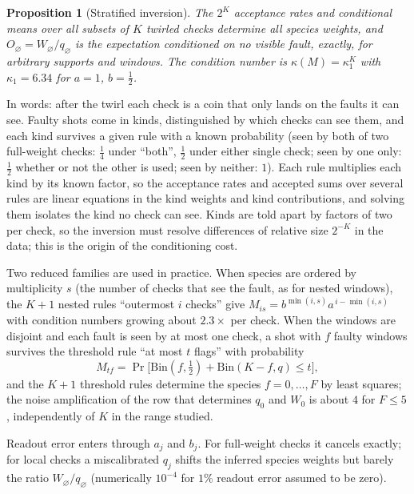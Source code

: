 \documentclass[11pt,a4paper]{article}
\newtheorem{proposition}{Proposition}
\theoremstyle{remark}
\newcommand{\Bin}{\mathrm{Bin}}
\begin{document}
\begin{proposition}[Stratified inversion]
The $2^K$ acceptance rates and conditional means over all subsets of $K$ twirled checks determine all species weights, and $O_\varnothing=W_\varnothing/q_\varnothing$ is the expectation conditioned on no visible fault, exactly, for arbitrary supports and windows. The condition number is $\kappa(M)=\kappa_1^K$ with $\kappa_1=6.34$ for $a=1$, $b=\tfrac12$.
\end{proposition}

In words: after the twirl each check is a coin that only lands on the faults it can see. Faulty shots come in kinds, distinguished by which checks can see them, and each kind survives a given rule with a known probability (seen by both of two full-weight checks: $\tfrac14$ under ``both'', $\tfrac12$ under either single check; seen by one only: $\tfrac12$ whether or not the other is used; seen by neither: $1$). Each rule multiplies each kind by its known factor, so the acceptance rates and accepted sums over several rules are linear equations in the kind weights and kind contributions, and solving them isolates the kind no check can see. Kinds are told apart by factors of two per check, so the inversion must resolve differences of relative size $2^{-K}$ in the data; this is the origin of the conditioning cost.

Two reduced families are used in practice. When species are ordered by multiplicity $s$ (the number of checks that see the fault, as for nested windows), the $K+1$ nested rules ``outermost $i$ checks'' give $M_{is}=b^{\min(i,s)}a^{\,i-\min(i,s)}$ with condition numbers growing about $2.3\times$ per check. When the windows are disjoint and each fault is seen by at most one check, a shot with $f$ faulty windows survives the threshold rule ``at most $t$ flags'' with probability
\begin{equation}
M_{tf}=\Pr\big[\Bin(f,\tfrac12)+\Bin(K-f,q)\le t\big],
\label{eq:threshold}
\end{equation}
and the $K+1$ threshold rules determine the species $f=0,\dots,F$ by least squares; the noise amplification of the row that determines $q_0$ and $W_0$ is about $4$ for $F\le5$, independently of $K$ in the range studied.

Readout error enters through $a_j$ and $b_j$. For full-weight checks it cancels exactly; for local checks a miscalibrated $q_j$ shifts the inferred species weights but barely the ratio $W_\varnothing/q_\varnothing$ (numerically $10^{-4}$ for $1\%$ readout error assumed to be zero).
\end{document}
